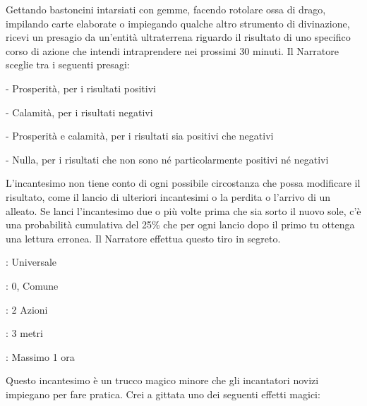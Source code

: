 \begin{multicols}{2}
Gettando bastoncini intarsiati con gemme, facendo rotolare ossa di drago, impilando carte elaborate o impiegando qualche altro strumento di divinazione, ricevi un presagio da un'entità ultraterrena riguardo il risultato di uno specifico corso di azione che intendi intraprendere nei prossimi 30 minuti. Il Narratore sceglie tra i seguenti presagi:

\medskip

- Prosperità, per i risultati positivi

- Calamità, per i risultati negativi

- Prosperità e calamità, per i risultati sia positivi che negativi

- Nulla, per i risultati che non sono né particolarmente positivi né negativi

L'incantesimo non tiene conto di ogni possibile circostanza che possa modificare il risultato, come il lancio di ulteriori incantesimi o la perdita o l'arrivo di un alleato. Se lanci l'incantesimo due o più volte prima che sia sorto il nuovo sole, c'è una probabilità cumulativa del 25\% che per ogni lancio dopo il primo tu ottenga una lettura erronea. Il Narratore effettua questo tiro in segreto.

\noindent\colorbox{OBSSgold!10}{
\begin{minipage}{0.95\linewidth}
\begin{description}[noitemsep, topsep=0pt, parsep=0pt, partopsep=0pt, leftmargin=0cm, labelwidth=1.3cm]
	\item[\textbf{Lista}]: Universale
	\item[\textbf{Livello}]: 0, Comune
	\item[\textbf{Lancio}]: 2 Azioni
	\item[\textbf{Gittata}]: 3 metri
	\item[\textbf{Durata}]: Massimo 1 ora
\end{description}
\end{minipage}}\smallskip

Questo incantesimo è un trucco magico minore che gli incantatori novizi impiegano per fare pratica. Crei a gittata uno dei seguenti effetti magici:


\end{multicols}
